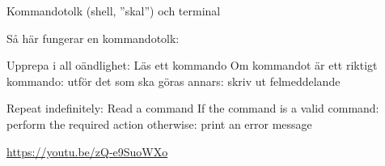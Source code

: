 \begin{Slide}{Kommandotolk (shell, ''skal'') och terminal}

Så här fungerar en kommandotolk:

\ifswedish
\begin{Code}[language=]
Upprepa i all oändlighet:
  Läs ett kommando
  Om kommandot är ett riktigt kommando:
    utför det som ska göras
  annars:
    skriv ut felmeddelande
\end{Code}
\else
\begin{Code}[language=]
Repeat indefinitely:
  Read a command
  If the command is a valid command:
    perform the required action
  otherwise:
    print an error message
\end{Code}
\fi{}

\vfill\url{https://youtu.be/zQ-e9SuoWXo}

\end{Slide}


